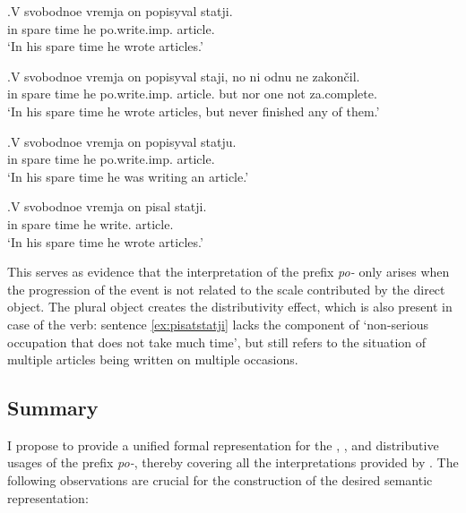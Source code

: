 \exg.\label{ex:popisyvat}V svobodnoe vremja on popisyval statji.\\
in spare time he po.write.imp. article.\\
\trans `In his spare time he wrote articles.'

\exg.\label{ex:popisyvat:none}V svobodnoe vremja on popisyval staji, no ni odnu ne zakon\v{c}il.\\
in spare time he po.write.imp. article. but nor one not za.complete.\\
\trans `In his spare time he wrote articles, but never finished any of them.'

\exg.\label{ex:popisyvat:single}V svobodnoe vremja on popisyval statju.\\
in spare time he po.write.imp. article.\\
\trans `In his spare time he was writing an article.'

\exg.\label{ex:pisatstatji}V svobodnoe vremja on pisal statji.\\
in spare time he write. article.\\
\trans `In his spare time he wrote articles.'

This serves as evidence that the  interpretation of the prefix \textit{po-} only arises when the progression of the event is not related to the scale contributed by the direct object. The plural object creates the distributivity effect, which is also present in case of the  verb: sentence \ref{ex:pisatstatji} lacks the component of `non-serious occupation that does not take much time', but still refers to the situation of multiple articles being written on multiple occasions. 

\subsection{Summary}
I propose to provide a unified formal representation for the , , and distributive usages of the prefix \textit{po-}, thereby covering all the interpretations provided by \citet{Shvedova:82}. The following observations are crucial for the construction of the desired semantic representation:

